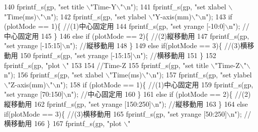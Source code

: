 \begin{DoxyCode}
{{140         fprintf\_s(gp, \textcolor{stringliteral}{"set title \(\backslash\)"Time-Y\(\backslash\)"\(\backslash\)n"});
141         fprintf\_s(gp, \textcolor{stringliteral}{"set xlabel \(\backslash\)"Time(ms)\(\backslash\)"\(\backslash\)n"});
142         fprintf\_s(gp, \textcolor{stringliteral}{"set ylabel \(\backslash\)"Y-axis(mm)\(\backslash\)"\(\backslash\)n"});
143         \textcolor{keywordflow}{if} (plotMode == 1)\{ \textcolor{comment}{//(1)中心固定用}
144             fprintf\_s(gp, \textcolor{stringliteral}{"set yrange [-10:0]\(\backslash\)n"}); \textcolor{comment}{//中心固定用}
145         \}
146         \textcolor{keywordflow}{else} \textcolor{keywordflow}{if} (plotMode == 2)\{ \textcolor{comment}{//(2)縦移動用}
147             fprintf\_s(gp, \textcolor{stringliteral}{"set yrange [-15:15]\(\backslash\)n"}); \textcolor{comment}{//縦移動用}
148         \}
149         \textcolor{keywordflow}{else} \textcolor{keywordflow}{if}(plotMode == 3)\{ \textcolor{comment}{//(3)横移動用}
150             fprintf\_s(gp, \textcolor{stringliteral}{"set yrange [-15:15]\(\backslash\)n"}); \textcolor{comment}{//横移動用}
151         \}
152         fprintf\_s(gp, \textcolor{stringliteral}{"plot \(\backslash\)"%
153 
154         \textcolor{comment}{//Time-Z}
155         fprintf\_s(gp, \textcolor{stringliteral}{"set title \(\backslash\)"Time-Z\(\backslash\)"\(\backslash\)n"});
156         fprintf\_s(gp, \textcolor{stringliteral}{"set xlabel \(\backslash\)"Time(ms)\(\backslash\)"\(\backslash\)n"});
157         fprintf\_s(gp, \textcolor{stringliteral}{"set ylabel \(\backslash\)"Z-axis(mm)\(\backslash\)"\(\backslash\)n"});
158         \textcolor{keywordflow}{if} (plotMode == 1)\{ \textcolor{comment}{//(1)中心固定用}
159             fprintf\_s(gp, \textcolor{stringliteral}{"set yrange [70:150]\(\backslash\)n"}); \textcolor{comment}{//中心固定用}
160         \}
161         \textcolor{keywordflow}{else} \textcolor{keywordflow}{if} (plotMode == 2)\{ \textcolor{comment}{//(2)縦移動用}
162             fprintf\_s(gp, \textcolor{stringliteral}{"set yrange [150:250]\(\backslash\)n"}); \textcolor{comment}{//縦移動用}
163         \}
164         \textcolor{keywordflow}{else} \textcolor{keywordflow}{if}(plotMode == 3)\{ \textcolor{comment}{//(3)横移動用}
165             fprintf\_s(gp, \textcolor{stringliteral}{"set yrange [50:250]\(\backslash\)n"}); \textcolor{comment}{//横移動用}
166         \}
167         fprintf\_s(gp, \textcolor{stringliteral}{"plot \(\backslash\)"%
}}}}
\end{DoxyCode}
